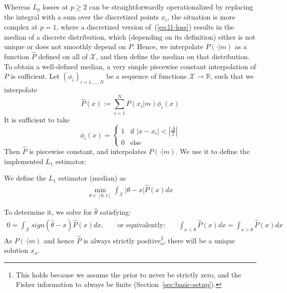 Whereas $L_p$ losses at $p\geq 2$ can be straightforwardly operationalized by replacing the integral with a sum over the discretized points $x_i$, the situation is more complex at $p=1$, where a discretized version of~(\ref{eq:l1-loss}) results in the median of a discrete distribution, which (depending on its definition) either is not unique or does not smoothly depend on $P$.
Hence, we interpolate $P(\cdot|m)$ as a function $\widehat{P}$ defined on all of $\mathcal{X}$, and then define the median on that distribution. %
To obtain a well-defined median, a very simple piecewise constant interpolation of $P$ is sufficient.
Let $(\phi_i)_{i=1, \dots, N}$ be a sequence of functions $\mathcal{X} \rightarrow \mathbb{R}$, such that we interpolate
\begin{equation}
    \widehat{P}(x) := \sum_{i=1}^N P(x_i|m) \phi_i(x)
\end{equation}
It is sufficient to take
\begin{equation}
    \phi_i(x) = \begin{cases}
        1 & \text{if } |x-x_i| < |\frac{\Delta}{2}| \\
        0 & \text{else}
    \end{cases}
\end{equation}
Then $\widehat{P}$ is piecewise constant, and interpolates $P(\cdot|m)$.
We use it to define the implemented $L_1$ estimator:
\begin{defin}
We define the $L_1$ estimator (median) as
\begin{align}\label{eq:interval-l1-estimator}
     \min_{\theta \in [0,1]} \int_{\mathcal{X}} |\theta-x| \widehat{P}(x) dx 
\end{align}
\end{defin}
To determine it, we solve for $\widehat{\theta}$ satisfying:
\begin{align}
   0=  \int_{\mathcal{X}} sign(\widehat{\theta}-x) \widehat{P}(x) dx, 
\ \ \ \ \ \ \ \text{ or equivalently: } \ \ \ \ \ \ \ 
\int_{x<\theta} \widehat{P}(x) dx  = \int_{x>\theta} \widehat{P}(x) dx 
\end{align}
As $P(\cdot|m)$ and hence $\widehat{P}$ is always strictly positive\footnote{This holds because we assume the prior to never be strictly zero, and the Fisher information to always be finite (Section~\ref{sec:basic-setup}).}, there will be a unique solution $x_a$.
